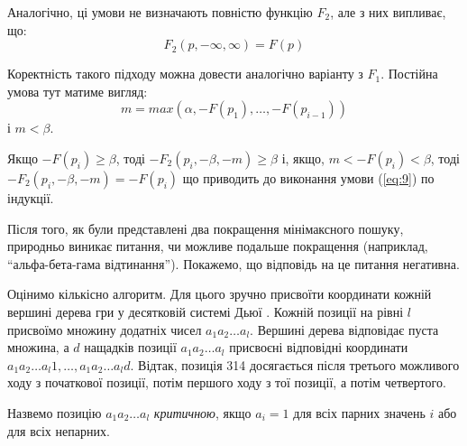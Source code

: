 \documentclass[12pt,a4paper]{article}
\begin{document}
Аналогічно, ці умови не визначають повністю функцію $F_2$, але з них випливає,
що:
\begin{equation}
  \label{eq:10}
  F_2(p, -\infty, \infty) = F(p)
\end{equation}

Коректність такого підходу можна довести аналогічно варіанту з $F_1$. Постійна
умова тут матиме вигляд:
\begin{equation}
  \label{eq:11}
  m = max(\alpha,-F(p_1),\dots,-F(p_{i-1}))
\end{equation}
і $m < \beta$.

Якщо $-F(p_i)\ge \beta$, тоді $-F_2(p_i, -\beta, -m) \ge \beta$
і, якщо, $m < -F(p_i) < \beta$, тоді $-F_2(p_i, -\beta, -m) = -F(p_i)$ що
приводить до виконання умови (\ref{eq:9}) по індукції.

Після того, як були представлені два покращення мінімаксного пошуку, природньо
виникає питання, чи можливе подальше покращення (наприклад,
``альфа-бета-гама відтинання''). Покажемо, що відповідь на це питання
негативна.

Оцінимо кількісно алгоритм. Для цього зручно присвоїти координати кожній
вершині дерева гри у десятковій системі Дьюї \cite{knuth}. Кожній позиції на
рівні $l$ присвоїмо множину додатніх чисел $a_1a_2 \dots a_l$. Вершині дерева
відповідає пуста множина, а $d$ нащадків позиції $a_1a_2 \dots a_l$
присвоєні відповідні координати $a_1a_2 \dots a_l1, \dots, a_1a_2 \dots a_ld$.
Відтак, позиція 314 досягається після третього можливого ходу з початкової
позиції, потім першого ходу з тої позиції, а потім четвертого.

Назвемо позицію $a_1a_2 \dots a_l$ \textit{критичною}, якщо $a_i=1$ для всіх
парних значень $i$ або для всіх непарних.
\end{document}
